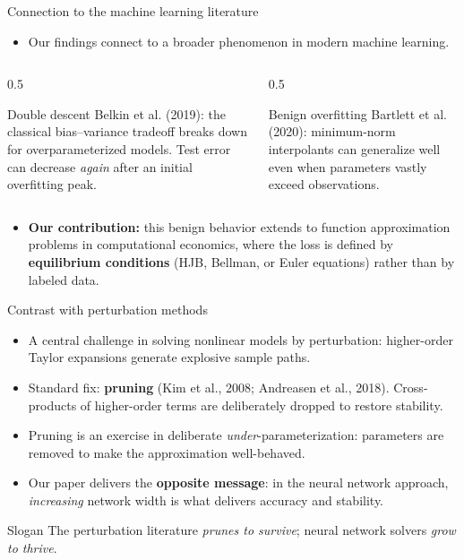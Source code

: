 \documentclass[aspectratio=169,10pt]{beamer}
\newcommand{\emphcolor}[1]{\textbf{\textcolor{emphcolorval}{#1}}}
\begin{document}
\begin{frame}{Connection to the machine learning literature}
	\begin{itemize}
		\item Our findings connect to a broader phenomenon in modern machine learning.
	\end{itemize}
	\vspace{0.1in}
	\begin{columns}
		\begin{column}{0.5\textwidth}
			\begin{block}{Double descent}
				\textcolor{emphcolorval}{Belkin et al. (2019)}: the classical bias--variance tradeoff breaks down for overparameterized models. Test error can decrease \emph{again} after an initial overfitting peak.
			\end{block}
		\end{column}
		\begin{column}{0.5\textwidth}
			\begin{block}{Benign overfitting}
				\textcolor{emphcolorval}{Bartlett et al. (2020)}: minimum-norm interpolants can generalize well even when parameters vastly exceed observations.
			\end{block}
		\end{column}
	\end{columns}
	\vspace{0.15in}
	\begin{itemize}
		\item \emphcolor{Our contribution:} this benign behavior extends to function approximation problems in computational economics, where the loss is defined by \emphcolor{equilibrium conditions} (HJB, Bellman, or Euler equations) rather than by labeled data.
	\end{itemize}
\end{frame}

\begin{frame}{Contrast with perturbation methods}
	\begin{itemize}
		\item A central challenge in solving nonlinear models by perturbation: higher-order Taylor expansions generate explosive sample paths.
		\item Standard fix: \emphcolor{pruning} (\textcolor{emphcolorval}{Kim et al., 2008; Andreasen et al., 2018}). Cross-products of higher-order terms are deliberately dropped to restore stability.
		\item Pruning is an exercise in deliberate \emph{under}-parameterization: parameters are removed to make the approximation well-behaved.
		\item Our paper delivers the \emphcolor{opposite message}: in the neural network approach, \emph{increasing} network width is what delivers accuracy and stability.
	\end{itemize}
	\begin{block}{Slogan}
		The perturbation literature \emph{prunes to survive}; neural network solvers \emph{grow to thrive}.
	\end{block}
\end{frame}
\end{document}
